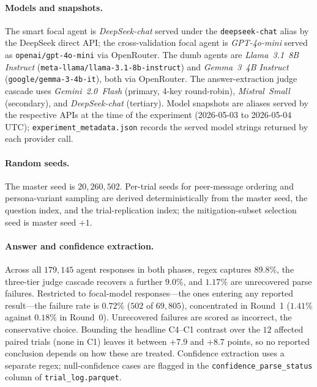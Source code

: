 \documentclass[11pt]{article}
\begin{document}
\paragraph{Models and snapshots.}
The smart focal agent is \textit{DeepSeek-chat} served under the
\texttt{deepseek-chat} alias by the DeepSeek direct API; the
cross-validation focal agent is \textit{GPT-4o-mini} served as
\texttt{openai/\allowbreak gpt-4o-mini} via OpenRouter.
The dumb agents are \textit{Llama~3.1~8B Instruct}
(\texttt{meta-llama/\allowbreak llama-3.1-8b-instruct}) and
\textit{Gemma~3~4B Instruct}
(\texttt{google/\allowbreak gemma-3-4b-it}), both via OpenRouter.
The answer-extraction judge cascade uses \textit{Gemini~2.0~Flash}
(primary, 4-key round-robin), \textit{Mistral~Small} (secondary),
and \textit{DeepSeek-chat} (tertiary).
Model snapshots are aliases served by the respective APIs at the
time of the experiment (2026-05-03 to 2026-05-04 UTC);
\texttt{experiment\_metadata.json} records the served model strings
returned by each provider call.

\paragraph{Random seeds.}
The master seed is $20{,}260{,}502$.
Per-trial seeds for peer-message ordering and persona-variant sampling
are derived deterministically from the master seed, the question
index, and the trial-replication index; the mitigation-subset
selection seed is master seed $+1$.

\paragraph{Answer and confidence extraction.}
Across all $179{,}145$ agent responses in both phases, regex captures
$89.8\%$, the three-tier judge cascade recovers a further $9.0\%$, and
$1.17\%$ are unrecovered parse failures.
Restricted to focal-model responses---the ones entering any reported
result---the failure rate is $0.72\%$ ($502$ of $69{,}805$), concentrated in
Round~1 ($1.41\%$ against $0.18\%$ in Round~0).
Unrecovered failures are scored as incorrect, the conservative choice.
Bounding the headline C4--C1 contrast over the $12$ affected paired trials
(none in C1) leaves it between $+7.9$ and $+8.7$ points, so no reported
conclusion depends on how these are treated.
Confidence extraction uses a separate regex; null-confidence cases are
flagged in the \texttt{confidence\_parse\_status} column of
\texttt{trial\_log.parquet}.
\end{document}
